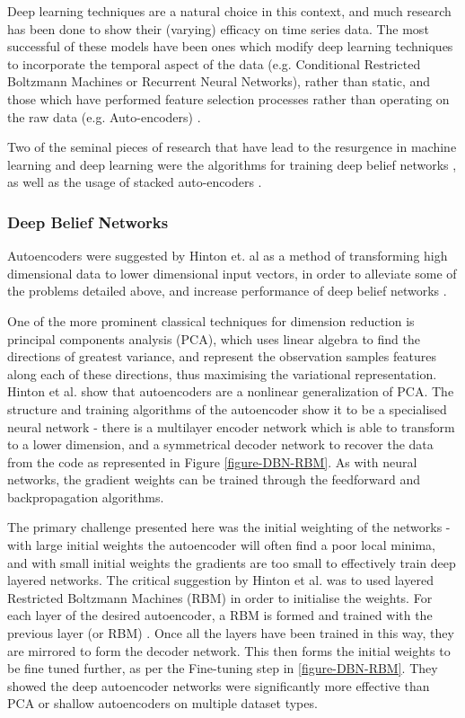 \documentclass[a4paper,11pt,oneside]{article}
\theoremstyle{plain}
\theoremstyle{definition}
\begin{document}
Deep learning techniques are a natural choice in this context, and much research has been done to show their 
(varying) efficacy on time series data. The most successful of these models have been ones which modify deep 
learning techniques to incorporate the temporal aspect of the data (e.g. Conditional Restricted Boltzmann 
Machines or Recurrent Neural Networks), rather than static, and those which have performed feature selection
 processes rather than operating on the raw data (e.g. Auto-encoders)  \cite{Langkvist}. 
 \hfill \break 
 
 
Two of the seminal pieces of research that have lead to the resurgence in machine learning and deep learning 
were the algorithms for training deep belief networks \cite{Hinton1}, as well as the usage of stacked auto-encoders
\cite{Ranzato1, Bengio1}. 

 
\subsubsection{Deep Belief Networks}\label{DBN}
 
 Autoencoders were suggested by Hinton et. al as a method of transforming high dimensional 
 data to lower dimensional input vectors, in order to alleviate some of the problems detailed above, and increase 
 performance of deep belief networks \cite{Hinton2}.
\hfill \break 

One of the more prominent classical techniques for dimension reduction is principal components analysis (PCA), 
which uses linear algebra to find the directions of greatest variance, and represent the observation samples 
features along each of these directions, thus maximising the variational representation. Hinton et al. show that 
autoencoders are a nonlinear generalization of PCA. The structure and training algorithms of the autoencoder 
show it to be a specialised neural network - there is a multilayer encoder network which is able to transform to a 
lower dimension, and a symmetrical decoder network to recover the data from the code as represented in Figure \ref{figure-DBN-RBM}. As with 
neural networks, the gradient weights can be trained through the feedforward and backpropagation algorithms.  
\hfill \break 

The primary challenge presented here was the initial weighting of the networks - with large initial weights the 
autoencoder will often find a poor local minima, and with small initial weights the gradients are too small to 
effectively train deep layered networks. The critical suggestion by Hinton et al. was to used layered Restricted 
Boltzmann Machines (RBM) in order to initialise the weights. For each layer of the desired autoencoder, a RBM is 
formed and trained with the previous layer (or RBM) \cite{Hinton3}. Once all the layers have been 
trained in this way, they are mirrored to form the decoder network. This then forms the initial weights to be fine 
tuned further, as per the Fine-tuning step in \ref{figure-DBN-RBM}. They showed the deep autoencoder networks were significantly more 
effective than PCA or shallow autoencoders on multiple dataset types. 
 \hfill \break 
 
\end{document}
